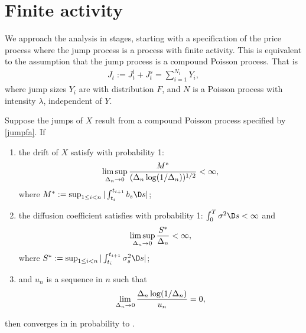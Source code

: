 \section{Finite activity}
We approach the analysis in stages, starting with a specification of the price process where the jump process is a \levy process with finite activity. This is equivalent to the assumption that the jump process is a compound Poisson process. That is 
\begin{align}
  J_t := J^l_t + J^s_t = \sum^{N_t}_{ i = 1} Y_i,
  \label{jumpfa}
\end{align}
where jump sizes $Y_i$ are \iid with distribution $F$, and $N$ is a Poisson process with intensity $\lambda$, independent of $Y$.

\begin{prop}\label{pro:finite}
  Suppose the  jumps of $X$ result from a compound Poisson process specified by  \eqref{jumpfa}.  
  If 
  \begin{enumerate}[label=\emph{(}\roman*\emph{)}]
    \item 
  the drift of $X$ satisfy with probability 1:
  \begin{align}
    \limsup_{\Delta_n \to 0} \frac{M^*}{(\Delta_n \log(1/\Delta_n))^{1/2}} < \infty, \notag
    \label{}
  \end{align}
where $M^* : = \sup_{1 \le i <n} \vert \int^{t_{i+1}}_{t_i} b_s \D s\vert$;
\item the diffusion coefficient satisfies with probability 1:  $\int^T_0 \sigma^2 \D s < \infty$ and 
  \begin{align}
\limsup_{\Delta_n \to 0} \frac{S^*}{\Delta_n} < \infty, \notag
    \label{}
  \end{align}
  where $S^* := \sup_{1 \le i <n} \vert \int^{t_{i+1}}_{t_i} \sigma^2_s \D s\vert$;
\item and   $u_n$ is a sequence in $n$ such that  
\begin{align}
    \lim_{\Delta_n \to 0} \frac{\Delta_n \log (1/\Delta_n)}{u_n} = 0,\notag
    \label{}
  \end{align}
  \end{enumerate}
  then 
  \jvn converges in \Ltwo in probability to \sv.
\end{prop}
